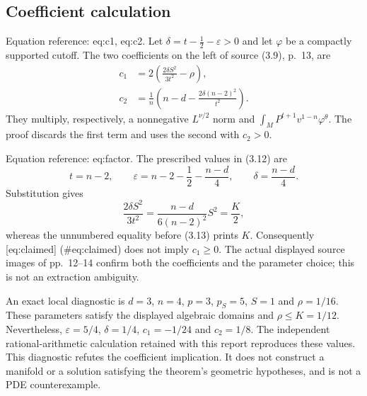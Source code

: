 \documentclass[10pt]{article}
\begin{document}
\subsection*{Coefficient calculation}
Equation reference: eq:c1, eq:c2. Let \(\delta=t-\tfrac12-\varepsilon>0\) and let \(\varphi\) be a compactly supported cutoff. The two coefficients on the left of source (3.9), p. 13, are \[\begin{aligned}
 c_1&=2\left(\frac{2\delta S^2}{3t^2}-\rho\right), \\
 c_2&=\frac1n\left(n-d-\frac{2\delta(n-2)^2}{t^2}\right). \end{aligned}\] They multiply, respectively, a nonnegative \(L^{\nu/2}\) norm and \(\int_M P^{t+1}v^{1-n}\varphi^\theta\). The proof discards the first term and uses the second with \(c_2>0\).\par
Equation reference: eq:factor. The prescribed values in (3.12) are \[t=n-2,\qquad
 \varepsilon=n-2-\frac12-\frac{n-d}{4},\qquad
 \delta=\frac{n-d}{4}.\] Substitution gives \[
 \frac{2\delta S^2}{3t^2}
   =\frac{n-d}{6(n-2)^2}S^2=\frac K2,\] whereas the unnumbered equality before (3.13) prints \(K\). Consequently [eq:claimed] (\#eq:claimed) does not imply \(c_1\ge0\). The actual displayed source images of pp. 12–14 confirm both the coefficients and the parameter choice; this is not an extraction ambiguity.\par
An exact local diagnostic is \(d=3\), \(n=4\), \(p=3\), \(p_S=5\), \(S=1\) and \(\rho=1/16\). These parameters satisfy the displayed algebraic domains and \(\rho\le K=1/12\). Nevertheless, \(\varepsilon=5/4\), \(\delta=1/4\), \(c_1=-1/24\) and \(c_2=1/8\). The independent rational-arithmetic calculation retained with this report reproduces these values. This diagnostic refutes the coefficient implication. It does not construct a manifold or a solution satisfying the theorem’s geometric hypotheses, and is not a PDE counterexample.\par
\end{document}
